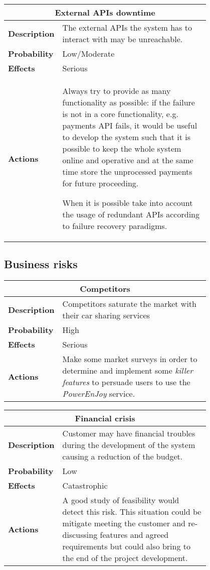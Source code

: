 \begin{longtable}{lp{0.8\linewidth}}
\multicolumn{2}{c}{\textbf{External APIs downtime}}\\
\toprule
\textbf{Description}& The external APIs the system has to interact with may be unreachable.\\
\midrule
\textbf{Probability}&Low/Moderate\\
\midrule
\textbf{Effects}&Serious\\
\midrule
\textbf{Actions}& Always try to provide as many functionality as possible: if the failure is not in a core functionality, e.g. payments API fails, it would be useful to develop the system such that it is possible to keep the whole system online and operative and at the same time store the unprocessed payments for future proceeding.

When it is possible take into account the usage of redundant APIs according to failure recovery paradigms. \\
\bottomrule
\end{longtable}

\subsection{Business risks}
\begin{longtable}{lp{0.8\linewidth}}
\multicolumn{2}{c}{\textbf{Competitors}}\\
\toprule
\textbf{Description}&Competitors saturate the market with their car sharing services\\
\midrule
\textbf{Probability}&High\\
\midrule
\textbf{Effects}&Serious\\
\midrule
\textbf{Actions}&Make some market surveys in order to determine and implement some \emph{killer features} to persuade users to use the \emph{PowerEnJoy} service.\\
\bottomrule
\end{longtable}

\begin{longtable}{lp{0.8\linewidth}}
\multicolumn{2}{c}{\textbf{Financial crisis}}\\
\toprule
\textbf{Description}&Customer may have financial troubles during the development of the system causing a reduction of the budget.\\
\midrule
\textbf{Probability}&Low\\
\midrule
\textbf{Effects}&Catastrophic\\
\midrule
\textbf{Actions}& A good study of feasibility would detect this risk.  This situation could be mitigate meeting the customer and re-discussing features and agreed requirements but could also bring to the end of the project development. \\
\bottomrule
\end{longtable}


